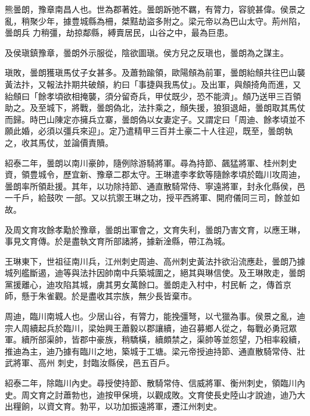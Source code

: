 
\begin{pinyinscope}

 熊曇朗，豫章南昌人也。世為郡著姓。曇朗跅弛不羈，有膂力，容貌甚偉。侯景之亂，稍聚少年，據豊城縣為柵，桀黠劫盜多附之。梁元帝以為巴山太守。荊州陷，曇朗兵
 力稍彊，劫掠鄰縣，縛賣居民，山谷之中，最為巨患。



 及侯瑱鎮豫章，曇朗外示服從，陰欲圖瑱。侯方兒之反瑱也，曇朗為之謀主。



 瑱敗，曇朗獲瑱馬仗子女甚多。及蕭勃踰領，歐陽頠為前軍，曇朗紿頠共往巴山襲黃法抃，又報法抃期共破頠，約曰「事捷與我馬仗」。及出軍，與頠掎角而進，又紿頠曰「餘孝頃欲相掩襲，須分留奇兵，甲仗既少，恐不能濟」。頠乃送甲三百領助之。及至城下，將戰，曇朗偽北，法抃乘之，頠失援，狼狽退衄，曇朗取其馬仗
 而歸。時巴山陳定亦擁兵立寨，曇朗偽以女妻定子。又謂定曰「周迪、餘孝頃並不願此婚，必須以彊兵來迎」。定乃遣精甲三百并土豪二十人往迎，既至，曇朗執之，收其馬仗，並論價責贖。



 紹泰二年，曇朗以南川豪帥，隨例除游騎將軍。尋為持節、飆猛將軍、桂州刺史資，領豊城令，歷宜新、豫章二郡太守。王琳遣李孝欽等隨餘孝頃於臨川攻周迪，曇朗率所領赴援。其年，以功除持節、通直散騎常侍、寧遠將軍，封永化縣侯，邑一千戶，給鼓吹
 一部。又以抗禦王琳之功，授平西將軍、開府儀同三司，餘並如故。



 及周文育攻餘孝勱於豫章，曇朗出軍會之，文育失利，曇朗乃害文育，以應王琳，事見文育傳。於是盡執文育所部諸將，據新淦縣，帶江為城。



 王琳東下，世祖征南川兵，江州刺史周迪、高州刺史黃法抃欲沿流應赴，曇朗乃據城列艦斷遏，迪等與法抃因帥南中兵築城圍之，絕其與琳信使。及王琳敗走，曇朗黨援離心，迪攻陷其城，虜其男女萬餘口。曇朗走入村中，村民斬
 之，傳首京師，懸于朱雀觀。於是盡收其宗族，無少長皆棄市。



 周迪，臨川南城人也。少居山谷，有膂力，能挽彊弩，以弋獵為事。侯景之亂，迪宗人周續起兵於臨川，梁始興王蕭毅以郡讓續，迪召募鄉人從之，每戰必勇冠眾軍。續所部渠帥，皆郡中豪族，稍驕橫，續頗禁之，渠帥等並怨望，乃相率殺續，推迪為主，迪乃據有臨川之地，築城于工塘。梁元帝授迪持節、通直散騎常侍、壯武將軍、高州
 刺史，封臨汝縣侯，邑五百戶。



 紹泰二年，除臨川內史。尋授使持節、散騎常侍、信威將軍、衡州刺史，領臨川內史。周文育之討蕭勃也，迪按甲保境，以觀成敗。文育使長史陸山才說迪，迪乃大出糧餉，以資文育。勃平，以功加振遠將軍，遷江州刺史。




\end{pinyinscope}
